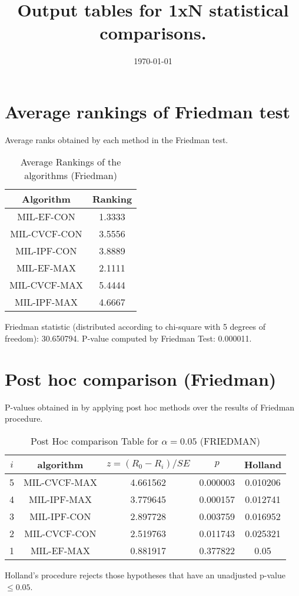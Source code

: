 \documentclass[a4paper,10pt]{article}
\title{Output tables for 1xN statistical comparisons.}
\author{}
\date{\today}
\begin{document}
\begin{landscape}
\pagestyle{empty}
\maketitle
\thispagestyle{empty}

\section{Average rankings of Friedman test}


Average ranks obtained by each method in the Friedman test.

\begin{table}[!htp]
\centering
\begin{tabular}{|c|c|}\hline
Algorithm&Ranking\\\hline
MIL-EF-CON&1.3333\\MIL-CVCF-CON&3.5556\\MIL-IPF-CON&3.8889\\MIL-EF-MAX&2.1111\\MIL-CVCF-MAX&5.4444\\MIL-IPF-MAX&4.6667\\\hline\end{tabular}
\caption{Average Rankings of the algorithms (Friedman)}
\end{table}

Friedman statistic (distributed according to chi-square with 5 degrees of freedom): 30.650794. \newline P-value computed by Friedman Test: 0.000011.\newline


\newpage

\section{Post hoc comparison (Friedman)}


P-values obtained in by applying post hoc methods over the results of Friedman procedure.

\begin{table}[!htp]
\centering\footnotesize
\begin{tabular}{ccccc}
$i$&algorithm&$z=(R_0 - R_i)/SE$&$p$&Holland\\
\hline5&MIL-CVCF-MAX&4.661562&0.000003&0.010206\\4&MIL-IPF-MAX&3.779645&0.000157&0.012741\\3&MIL-IPF-CON&2.897728&0.003759&0.016952\\2&MIL-CVCF-CON&2.519763&0.011743&0.025321\\1&MIL-EF-MAX&0.881917&0.377822&0.05\\\hline
\end{tabular}
\caption{Post Hoc comparison Table for $\alpha=0.05$ (FRIEDMAN)}
\end{table}Holland's procedure rejects those hypotheses that have an unadjusted p-value $\le0.05$.



\end{landscape}
\end{document}
